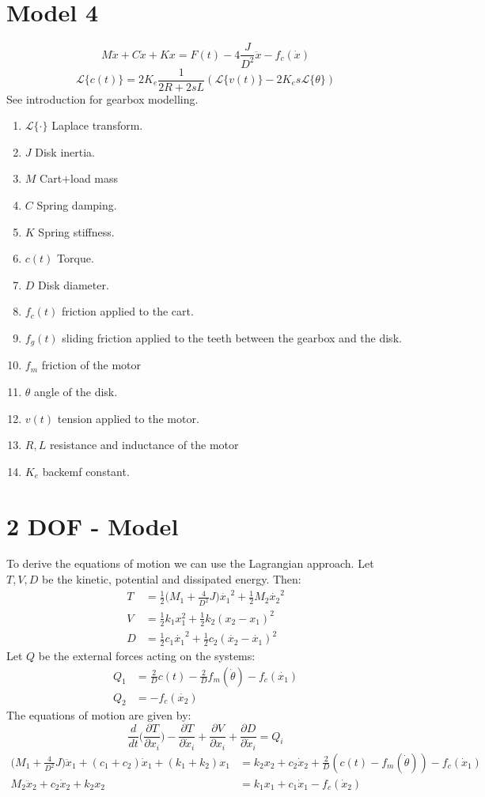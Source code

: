 \section{Model 4 }
$$M\ddot{x} + C\dot{x}+Kx = F(t) - 4\frac{J}{D^2}\ddot{x}- f_c(\dot{x})$$
$$\mathcal{L}\{c(t)\} = 2K_e \frac{1}{2R+2sL} (\mathcal{L}\{ v(t)\}-2K_e s \mathcal{L}\{\theta \})$$
See introduction for gearbox modelling.
\begin{enumerate}
\item $\mathcal{L}\{\cdot \}$ Laplace transform.
\item $J$ Disk inertia.
\item $M$ Cart+load mass
\item $C$ Spring damping.
\item $K$ Spring stiffness.
\item $c(t)$ Torque.
\item $D$ Disk diameter.
\item $f_c(t)$ friction applied to the cart.
\item $f_g(t)$ sliding friction applied to the teeth between the gearbox and the disk.
\item $f_m$ friction of the motor
\item $\theta$ angle of the disk.
\item $v(t)$ tension applied to the motor.
\item $R,L$ resistance and inductance of the motor
\item $K_e$ backemf constant.

\end{enumerate}

\section{2 DOF - Model}
To derive the equations of motion we can use the Lagrangian approach. Let $T,V,D$ be the kinetic, potential and dissipated energy. Then:
\begin{align*}
T  &= \frac{1}{2} \Big(M_1 + \frac{4}{D^2}J \Big) \dot{x_1}^2 + \frac{1}{2}M_2 \dot{x_2}^2 \\
V &= \frac{1}{2}k_1x_1^2 + \frac{1}{2}k_2(x_2-x_1)^2 \\
D &= \frac{1}{2}c_1\dot{x_1}^2 + \frac{1}{2}c_2(\dot{x_2}-\dot{x_1})^2
\end{align*}
Let $Q$ be the external forces acting on the systems:
\begin{align*}
Q_1 &= \frac{2}{D}c(t) - \frac{2}{D}f_m(\dot{\theta}) - f_c(\dot{x_1}) \\
Q_2 &=  - f_c(\dot{x_2})
\end{align*}
The equations of motion are given by:
$$\frac{d}{dt}\Big(\frac{\partial T}{\partial x_i} \Big) -\frac{\partial T}{\partial \dot{x}_i} + \frac{\partial V}{\partial x_i} + \frac{\partial D}{\partial \dot{x}_i} = Q_i$$
\begin{align*}
\Big(M_1+\frac{4}{D^2}J \Big)\ddot{x}_1+(c_1+c_2)\dot{x}_1 +(k_1+k_2)x_1 &= k_2 x_2 +c_2 \dot{x}_2 + \frac{2}{D}(c(t)-f_m(\dot{\theta}))-f_c(\dot{x}_1) \\
M_2 \ddot{x}_2 +c_2 \dot{x}_2 +k_2x_2 &= k_1x_1+c_1\dot{x}_1 -f_c(\dot{x}_2)
\end{align*}


